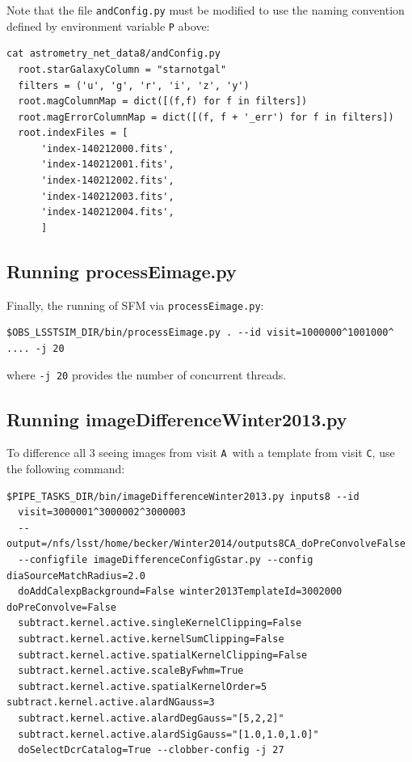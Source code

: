 \documentclass[DM,toc]{lsstdoc}
\def\A{{\tt A}}
\def\C{{\tt C}}
\begin{document}
Note that the file {\tt andConfig.py} must be modified to use the
naming convention defined by environment variable {\tt P} above:

{\small
\begin{Verbatim}[frame=single]
cat astrometry_net_data8/andConfig.py
  root.starGalaxyColumn = "starnotgal"
  filters = ('u', 'g', 'r', 'i', 'z', 'y')
  root.magColumnMap = dict([(f,f) for f in filters])
  root.magErrorColumnMap = dict([(f, f + '_err') for f in filters])
  root.indexFiles = [
      'index-140212000.fits',
      'index-140212001.fits',
      'index-140212002.fits',
      'index-140212003.fits',
      'index-140212004.fits',
      ]
\end{Verbatim}
}

\subsection{Running processEimage.py}

Finally, the running of SFM via {\tt processEimage.py}:

{\small
\begin{Verbatim}[frame=single]
$OBS_LSSTSIM_DIR/bin/processEimage.py . --id visit=1000000^1001000^ .... -j 20
\end{Verbatim}
}
where {\tt -j 20} provides the number of concurrent threads.

\subsection{Running imageDifferenceWinter2013.py}

To difference all 3 seeing images from visit \A\ with a template from visit \C,
use the following command:
{\small
\begin{Verbatim}[frame=single]
$PIPE_TASKS_DIR/bin/imageDifferenceWinter2013.py inputs8 --id
  visit=3000001^3000002^3000003
  --output=/nfs/lsst/home/becker/Winter2014/outputs8CA_doPreConvolveFalse
  --configfile imageDifferenceConfigGstar.py --config diaSourceMatchRadius=2.0
  doAddCalexpBackground=False winter2013TemplateId=3002000  doPreConvolve=False
  subtract.kernel.active.singleKernelClipping=False
  subtract.kernel.active.kernelSumClipping=False
  subtract.kernel.active.spatialKernelClipping=False
  subtract.kernel.active.scaleByFwhm=True
  subtract.kernel.active.spatialKernelOrder=5 subtract.kernel.active.alardNGauss=3
  subtract.kernel.active.alardDegGauss="[5,2,2]"
  subtract.kernel.active.alardSigGauss="[1.0,1.0,1.0]"
  doSelectDcrCatalog=True --clobber-config -j 27
\end{Verbatim}
}
\end{document}
